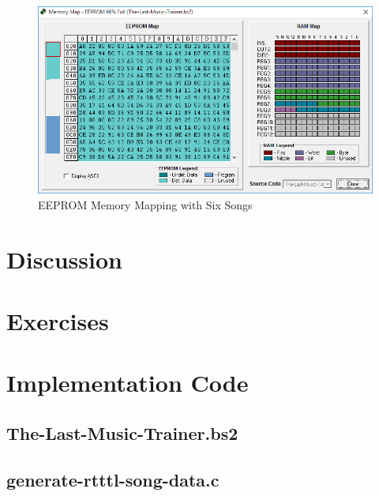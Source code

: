\documentclass[11pt]{article}
\begin{document}
\begin{figure}[h!]
\centering
\includegraphics[width=\textwidth]{memory-map.png}
\caption{EEPROM Memory Mapping with Six Songs}
\label{memory-map}
\end{figure}

\section{Discussion}

\section{Exercises}

\clearpage

\section{Implementation Code}

\subsection{The-Last-Music-Trainer.bs2}

\begingroup
\fontsize{10pt}{12pt}

\endgroup

\clearpage
\subsection{generate-rtttl-song-data.c}


\end{document}
